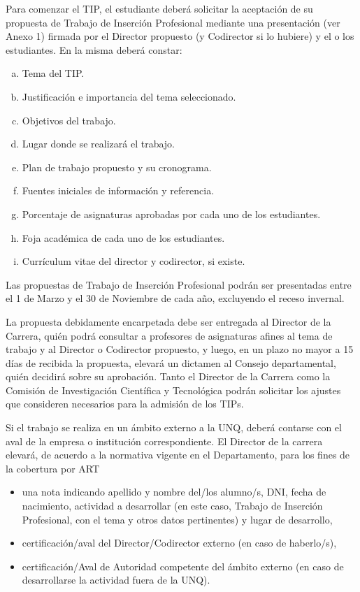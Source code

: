 
\articulo Para comenzar el TIP, el estudiante deberá solicitar la aceptación
de su propuesta de Trabajo de Inserción Profesional mediante una presentación (ver
Anexo 1) firmada por el Director propuesto (y Codirector si lo hubiere) y el o los
estudiantes. En la misma deberá constar:

\begin{enumerate}[a.]
\item Tema del TIP.
\item Justificación e importancia del tema seleccionado.
\item Objetivos del trabajo.
\item Lugar donde se realizará el trabajo.
\item Plan de trabajo propuesto y su cronograma.
\item Fuentes iniciales de información y referencia.
\item Porcentaje de asignaturas aprobadas por cada uno de los estudiantes.
\item Foja académica de cada uno de los estudiantes.
\item Currículum vitae del director y codirector, si existe.
\end{enumerate}

\articulo Las propuestas de Trabajo de Inserción Profesional podrán ser
presentadas entre el 1 de Marzo y el 30 de Noviembre de cada año, excluyendo el
receso invernal.

\articulo La propuesta debidamente encarpetada debe ser entregada al
Director de la Carrera, quién podrá consultar a profesores de asignaturas afines al
tema de trabajo y al Director o Codirector propuesto, y luego, en un plazo no mayor a
15 días de recibida la propuesta, elevará un dictamen al Consejo departamental,
quién decidirá sobre su aprobación. Tanto el Director de la Carrera como la Comisión de Investigación
Científica y Tecnológica podrán solicitar los ajustes que consideren necesarios para la
admisión de los TIPs. 

\articulo Si el trabajo se realiza en un ámbito externo a la UNQ, deberá
contarse con el aval de la empresa o institución correspondiente. El Director de la
carrera elevará, de acuerdo a la normativa vigente en el Departamento, para los fines
de la cobertura por ART

\begin{itemize}
 \item una nota indicando apellido y nombre del/los alumno/s, DNI, fecha
 de nacimiento, actividad a desarrollar (en este caso, Trabajo de
 Inserción Profesional, con el tema y otros datos pertinentes) y lugar
 de desarrollo,
 \item certificación/aval del Director/Codirector externo (en caso de
 haberlo/s),
 \item certificación/Aval de Autoridad competente del ámbito externo (en
 caso de desarrollarse la actividad fuera de la UNQ).
\end{itemize}


